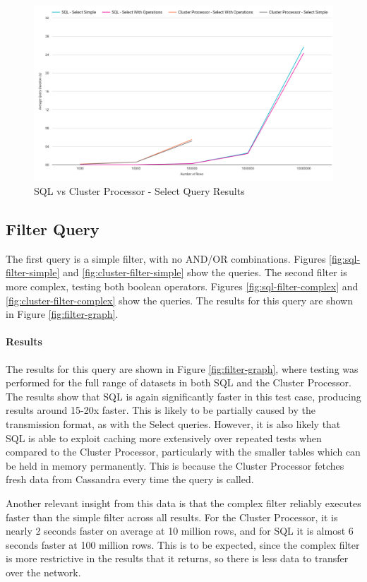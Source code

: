 \begin{figure}[ht]
	\centering
	\includegraphics[width=0.8\linewidth]{chapters/diagrams/testing/select-simple-1k-1m}
	\caption{SQL vs Cluster Processor - Select Query Results}
	\label{fig:select-graph}
\end{figure}

\subsection{Filter Query}
The first query is a simple filter, with no AND/OR combinations. Figures \ref{fig:sql-filter-simple} and \ref{fig:cluster-filter-simple} show the queries.  The second filter is more complex, testing both boolean operators. Figures \ref{fig:sql-filter-complex} and \ref{fig:cluster-filter-complex} show the queries.
The results for this query are shown in Figure \ref{fig:filter-graph}. 

\paragraph{Results}
The results for this query are shown in Figure \ref{fig:filter-graph}, where testing was performed for the full range of datasets in both SQL and the Cluster Processor. The results show that SQL is again significantly faster in this test case, producing results around 15-20x faster. This is likely to be partially caused by the transmission format, as with the Select queries. However, it is also likely that SQL is able to exploit caching more extensively over repeated tests when compared to the Cluster Processor, particularly with the smaller tables which can be held in memory permanently. This is because the Cluster Processor fetches fresh data from Cassandra every time the query is called.

Another relevant insight from this data is that the complex filter reliably executes faster than the simple filter across all results. For the Cluster Processor, it is nearly 2 seconds faster on average at 10 million rows, and for SQL it is almost 6 seconds faster at 100 million rows. This is to be expected, since the complex filter is  more restrictive in the results that it returns, so there is less data to transfer over the network.

